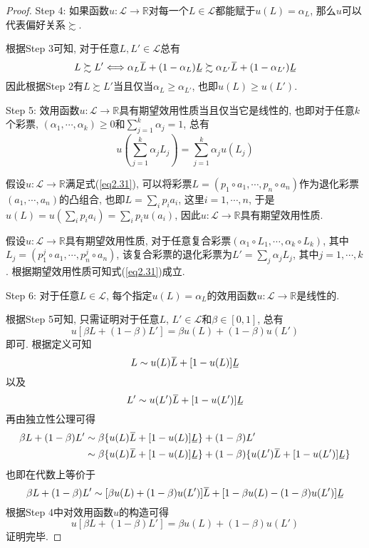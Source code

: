 \documentclass[cn, 12pt, math=mtpro2, bibstyle=apa, blue]{elegantbook}
\newcommand{\R}{\mathbb{R}}
\newcommand{\overbar}[1]{\mkern 1.5mu\overline{\mkern-1.5mu#1\mkern-1.5mu}\mkern 1.5mu}
\newcommand{\ubar}[1]{\mkern 1.5mu\underline{\mkern-1.5mu#1\mkern-1.5mu}\mkern 1.5mu}
\begin{document}
\begin{proof}
  Step 4: 如果函数$u:\mathscr{L}\to\R$对每一个$L\in\mathscr{L}$都能赋于$u(L)=\alpha_L$, 那么$u$可以代表偏好关系$\succsim$.
  
  根据Step 3可知, 对于任意$L, L'\in\mathscr{L}$总有
  $$L\succsim L'\Longleftrightarrow \alpha_L\overbar{L}+(1-\alpha_L)\ubar{L}\succsim \alpha_{L'}\overbar{L}+(1-\alpha_{L'})\ubar{L}$$
  因此根据Step 2有$L\succsim L'$当且仅当$\alpha_L\geq \alpha_{L'}$, 也即$u(L)\geq u(L')$.
  
  Step 5: 效用函数$u:\mathscr{L}\to\R$具有期望效用性质当且仅当它是线性的, 也即对于任意$k$个彩票, $(\alpha_1,\cdots,\alpha_k)\ge 0$和$\sum_{j=1}^k \alpha_j=1$, 总有
  \begin{equation}\label{eq2.31}
    u\left(\sum_{j=1}^{k}\alpha_j L_j\right)=\sum_{j=1}^{k}\alpha_ju(L_j)
  \end{equation}
  
  假设$u:\mathscr{L}\to\R$满足式(\ref{eq2.31}), 可以将彩票$L=(p_1\circ a_1,\cdots, p_n\circ a_n)$作为退化彩票$(a_1,\cdots,a_n)$的凸组合, 也即$L=\sum_{i} p_ia_i$, 这里$i=1,\cdots,n$, 于是$u(L)=u(\sum_ip_ia_i)=\sum_ip_iu(a_i)$, 因此$u:\mathscr{L}\to\R$具有期望效用性质.
  
  假设$u:\mathscr{L}\to\R$具有期望效用性质, 对于任意复合彩票$(\alpha_1\circ L_1,\cdots,\alpha_k\circ L_k)$, 其中$L_j=(p_1^j\circ a_1,\cdots, p_n^j\circ a_n)$, 该复合彩票的退化彩票为$L'=\sum_j\alpha_jL_j$, 其中$j=1,\cdots,k$. 根据期望效用性质可知式(\ref{eq2.31})成立.
  
  Step 6: 对于任意$L\in\mathscr{L}$, 每个指定$u(L)=\alpha_L$的效用函数$u:\mathscr{L}\to\R$是线性的.
  
  根据Step 5可知, 只需证明对于任意$L$, $L'\in\mathscr{L}$和$\beta\in[0,1]$, 总有
  $$u[\beta L+(1-\beta)L']=\beta u(L)+(1-\beta)u(L')$$
  即可. 根据定义可知
  $$L\sim u(L)\overbar{L}+[1-u(L)]\ubar{L}$$
  以及
  $$L'\sim u(L')\overbar{L}+[1-u(L')]\ubar{L}$$
  再由独立性公理可得
  \begin{align*}
  \beta L+(1-\beta)L'&\sim\beta\{u(L)\overbar{L}+[1-u(L)]\ubar{L}\}+(1-\beta)L' \\
  &\sim\beta\{u(L)\overbar{L}+[1-u(L)]\ubar{L}\}+(1-\beta)\{u(L')\overbar{L}+[1-u(L')]\ubar{L}\}
  \end{align*}
  也即在代数上等价于
  $$\beta L+(1-\beta)L'\sim [\beta u(L)+(1-\beta)u(L')]\overbar{L}+[1-\beta u(L)-(1-\beta)u(L')]\ubar{L}$$
  根据Step 4中对效用函数$u$的构造可得
  $$u[\beta L+(1-\beta)L']=\beta u(L)+(1-\beta)u(L')$$
  证明完毕.
\end{proof}
\end{document}
